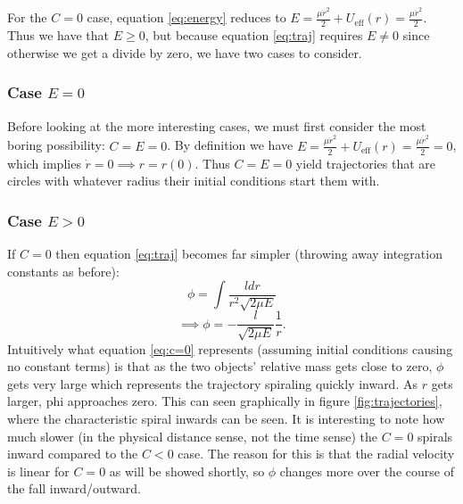 \documentclass[letterpaper, reqno,11pt]{article}
\begin{document}
For the $C=0$ case, equation \ref{eq:energy} reduces to $E=\frac{\mu \dot r^2}{2}+U_{\text{eff}}(r)=\frac{\mu\dot r^2}{2}$. Thus we have that $E\geq0$, but because equation \ref{eq:traj} requires $E\neq 0$ since otherwise we get a divide by zero, we have two cases to consider. 

\subsubsection{Case $E=0$}

Before looking at the more interesting cases, we must first consider the most boring possibility: $C=E=0$. By definition we have $E=\frac{\mu \dot r^2}{2}+U_{\text{eff}}(r)=\frac{\mu\dot r^2}{2}=0$, which implies $\dot r=0\implies r=r(0)$. Thus $C=E=0$ yield trajectories that are circles with whatever radius their initial conditions start them with. %

\subsubsection{Case $E> 0$}

If $C=0$ then equation \ref{eq:traj} becomes far simpler (throwing away integration constants as before): 
\[
\phi = \int \frac{ldr}{r^2\sqrt{2\mu E} }
\]
\begin{equation}\label{eq:c=0}
\implies\phi=-\frac{l}{\sqrt{2\mu E} } \frac{1}{r}
.\end{equation}
Intuitively what equation \ref{eq:c=0} represents (assuming initial conditions causing no constant terms) is that as the two objects' relative mass gets close to zero, $\phi$ gets very large which represents the trajectory spiraling quickly inward. As $r$ gets larger, phi approaches zero. This can seen graphically in figure \ref{fig:trajectories}, where the characteristic spiral inwards can be seen. It is interesting to note how much slower (in the physical distance sense, not the time sense) the $C=0$ spirals inward compared to the $C<0$ case. The reason for this is that the radial velocity is linear for $C=0$ as will be showed shortly, so $\phi$ changes more over the course of the fall inward/outward. 
\end{document}
